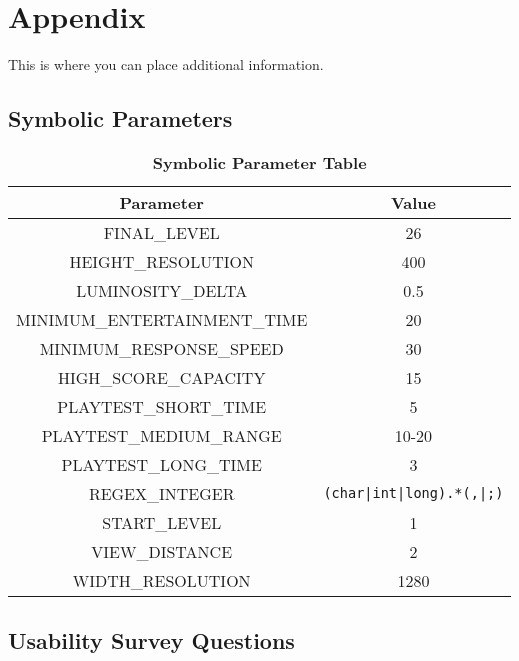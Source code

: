 \documentclass[12pt, titlepage]{article}
\begin{document}


\newpage
\section{Appendix}
\label{section7}

	This is where you can place additional information.

	\subsection{Symbolic Parameters}

		\begin{table}[h!]
			\centering
			\caption{\textbf{Symbolic Parameter Table}}
			\label{symbolicParameters}
			\bigskip
			\def\arraystretch{1.6}


			\begin{tabular}{| c | c |}
				\bottomrule
				\textbf{Parameter} & \textbf{Value} \\
				\hline
				FINAL\_LEVEL & 26 \\
				HEIGHT\_RESOLUTION & 400 \\
				LUMINOSITY\_DELTA & 0.5 \\
				MINIMUM\_ENTERTAINMENT\_TIME & 20 \\
				MINIMUM\_RESPONSE\_SPEED & 30 \\
				HIGH\_SCORE\_CAPACITY & 15 \\
				PLAYTEST\_SHORT\_TIME & 5 \\
				PLAYTEST\_MEDIUM\_RANGE & 10-20 \\
				PLAYTEST\_LONG\_TIME & 3 \\
				REGEX\_INTEGER & \lstinline$(char|int|long).*(,|;)$ \\
				START\_LEVEL & 1 \\
				VIEW\_DISTANCE & 2 \\
				WIDTH\_RESOLUTION & 1280 \\
				\toprule
			\end{tabular}
		\end{table}

\newpage
\subsection{Usability Survey Questions}
\end{document}
